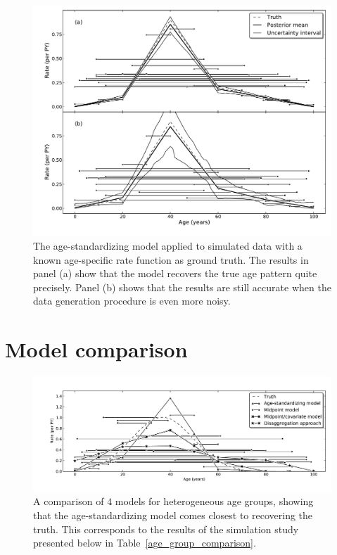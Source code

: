 \begin{figure}[h]
\begin{center}
\includegraphics[width=\textwidth]{age_group_standardize.pdf}
\caption{The age-standardizing model applied to simulated data with a
  known age-specific rate function as ground truth.  The results in
  panel (a) show that the model 
  recovers the true age pattern quite precisely. Panel (b) shows that the
  results are still accurate when the data generation procedure is
  even more noisy.}
\label{age-group-standardize}
\end{center}
\end{figure}


\section{Model comparison}
\label{agm-compare}

\begin{figure}[h]
\begin{center}
\includegraphics[width=\textwidth]{age_group_models.pdf}
\caption{A comparison of $4$ models for heterogeneous age groups, showing that the age-standardizing model comes closest to recovering the truth.  This corresponds to the results of the simulation study presented below in Table~\ref{age_group_comparison}.}
\label{age-group-model-comparison}
\end{center}
\end{figure}


